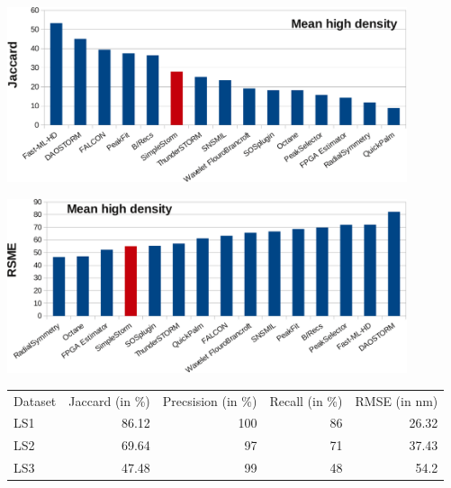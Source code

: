 \begin{center}

\includegraphics[width = 0.88\textwidth]{pictures/diagrammsChallenge/MeanHighDensityJaccardCropped.pdf}
	\label{meanJaccardHighDensity}
\end{center}

\begin{center}
\includegraphics[width = 0.88\textwidth]{pictures/diagrammsChallenge/MeanHighDensityRSMECropped.pdf}
	\label{meanRSMEHighDensity}
\end{center}



\begin{center}
\begin{tabular}{lrrrr}
Dataset&Jaccard (in \%)&Precsision (in \%)& Recall (in \%) & RMSE (in nm)\\
LS1&86.12&100&86&26.32\\
LS2&69.64&97&71&37.43\\
LS3&47.48&99&48&54.2
\end{tabular}\label{resls1}
\end{center}


